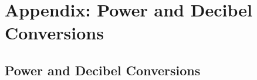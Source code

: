 \chapter{Appendix: Power and Decibel Conversions}
\label{app:power_db}

\section{Power and Decibel Conversions}
\label{sec:power_decibel}
